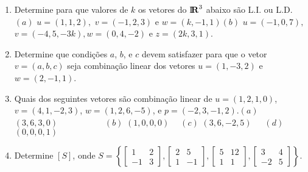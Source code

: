 \documentclass{report}
\begin{document}
\begin{Exercise}
\begin{enumerate}

\item \label{7lista3} Determine para que valores de $k$ os vetores do $%
\mbox{${\rm I}\!\mbox{\boldmath $ {\rm R}$}$}%
^{3}$ abaixo s\~{a}o L.I. ou L.D.\newline $(a)$ $u=(1,1,2),$
$v=(-1,2,3)$ e $w=(k,-1,1)$\newline $(b)$ $u=(-1,0,7),$
$v=(-4,5,-3k),w=(0,4,-2)$ e $z=(2k,3,1)$.


\item \label{8lista3} Determine que condi\c{c}\~{o}es $a$, $b$, e
$c$ devem satisfazer para
que o vetor $v=(a,b,c)$ seja combina\c{c}\~{a}o linear dos vetores $%
u=(1,-3,2)$ e $w=(2,-1,1)$.


\item \label{9lista3} Quais dos seguintes vetores s\~{a}o combina\c{c}\~{a}o
linear de $%
u=\left( 1,2,1,0\right) $, $v=\left( 4,1,-2,3\right) $,\linebreak
$w=\left( 1,2,6,-5\right) $, e $p=\left( -2,3,-1,2\right)
.$\newline $(a)$ $\left( 3,6,3,0\right) \qquad \qquad $\ \ \ $(b)$
$\left( 1,0,0,0\right)
\; $\ \qquad \qquad \ $(c)$ $\left( 3,6,-2,5\right) $\ \qquad \ \qquad \ $(d)$ $%
\left( 0,0,0,1\right) $


\item \label{10lista3} Determine $\left[ S\right] $, onde
$S=\left\{ \left[
\begin{array}{rr}
1 & 2 \\
-1 & 3
\end{array}
\right] ,\left[
\begin{array}{cc}
2 & 5 \\
1 & -1
\end{array}
\right] ,\left[
\begin{array}{rr}
5 & 12 \\
1 & 1
\end{array}
\right] ,\left[
\begin{array}{rr}
3 & 4 \\
-2 & 5
\end{array}
\right] \right\} .$


\end{enumerate}
\end{Exercise}
\end{document}
